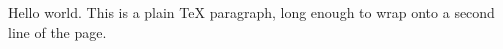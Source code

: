 Hello world. This is a plain TeX paragraph, long enough to wrap onto a
second line of the page.



\bye
